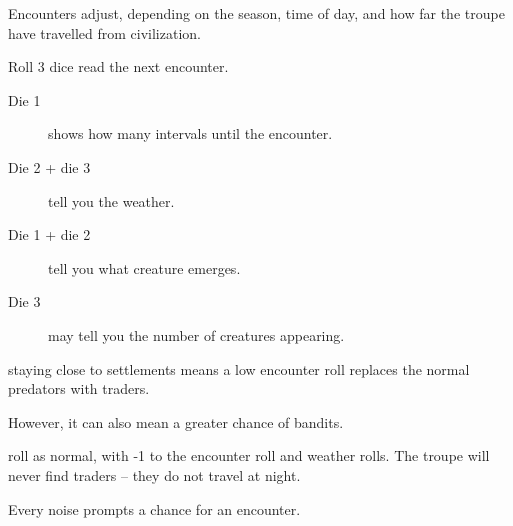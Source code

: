 \begin{multicols}{2}
\begin{figure*}[b!]
\begin{multicols}{3}
\end{multicols}

\end{figure*}

\noindent
Encounters adjust, depending on the season, time of day, and how far the troupe have travelled from civilization.

\begin{description}
  \item
  Roll 3 dice read the next encounter.
  \begin{description}
    \item[Die 1]
    shows how many \glspl{interval} until the encounter.
    \item[Die 2 + die 3]
    tell you the weather.
    \item[Die 1 + die 2]
    tell you what creature emerges.
    \item[Die 3]
    may tell you the number of creatures appearing.
  \end{description}
  \item[During the day]
  staying close to settlements means a low encounter roll replaces the normal predators with traders.

  However, it can also mean a greater chance of bandits.

  \item[At night]
  roll as normal, with -1 to the encounter roll and weather rolls.
  The troupe will never find traders -- they do not travel at night.
  \item[In the deep forest]
  Every noise prompts a chance for an encounter.
\end{description}

\end{multicols}

\pagebreak

